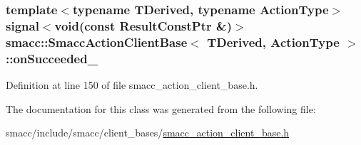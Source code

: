 \subsubsection[{\texorpdfstring{on\+Succeeded\+\_\+}{onSucceeded_}}]{\setlength{\rightskip}{0pt plus 5cm}template$<$typename T\+Derived, typename Action\+Type$>$ signal$<$void(const Result\+Const\+Ptr \&)$>$ {\bf smacc\+::\+Smacc\+Action\+Client\+Base}$<$ T\+Derived, Action\+Type $>$\+::on\+Succeeded\+\_\+\hspace{0.3cm}{\ttfamily [protected]}}\hypertarget{classsmacc_1_1SmaccActionClientBase_a033d789a6688b5064be4843a82fa007f}{}\label{classsmacc_1_1SmaccActionClientBase_a033d789a6688b5064be4843a82fa007f}


Definition at line 150 of file smacc\+\_\+action\+\_\+client\+\_\+base.\+h.



The documentation for this class was generated from the following file\+:\begin{DoxyCompactItemize}
\item 
smacc/include/smacc/client\+\_\+bases/\hyperlink{smacc__action__client__base_8h}{smacc\+\_\+action\+\_\+client\+\_\+base.\+h}\end{DoxyCompactItemize}

